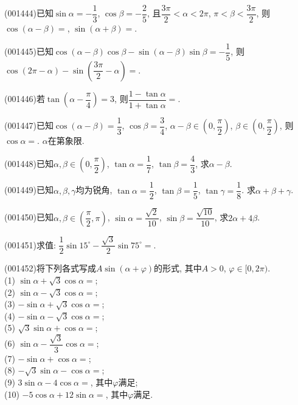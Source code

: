 \item (001444)已知$\sin\alpha=-\dfrac{1}{3}$, $\cos\beta=-\dfrac{2}{5}$, 且$\dfrac{3\pi}{2}<\alpha<2\pi$, $\pi<\beta<\dfrac{3\pi}{2}$, 则$\cos(\alpha-\beta)=$, $\sin(\alpha+\beta)=$.
\item (001445)已知$\cos(\alpha-\beta)\cos\beta-\sin(\alpha-\beta)\sin\beta=-\dfrac{1}{5}$, 则$\cos(2\pi-\alpha)-\sin\left(\dfrac{3\pi}{2}-\alpha\right)=$.
\item (001446)若$\tan\left(\alpha-\dfrac{\pi}4\right)=3$, 则$\dfrac{1-\tan\alpha}{1+\tan\alpha}=$.
\item (001447)已知$\cos(\alpha-\beta)=\dfrac 13$, $\cos \beta=\dfrac 34$, $\alpha-\beta \in \left(0,\dfrac{\pi}{2}\right)$, $\beta\in \left(0,\dfrac{\pi}{2}\right)$, 则$\cos\alpha=$. $\alpha$在第象限.
\item (001448)已知$\alpha,\beta\in \left(0,\dfrac{\pi}{2}\right)$, $\tan\alpha=\dfrac{1}{7}$, $\tan\beta=\dfrac{4}{3}$, 求$\alpha-\beta$.
\item (001449)已知$\alpha,\beta,\gamma$均为锐角, $\tan\alpha=\dfrac{1}{2}$, $\tan\beta=\dfrac{1}{5}$, $\tan\gamma=\dfrac{1}{8}$. 求$\alpha+\beta+\gamma$.
\item (001450)已知$\alpha,\beta\in \left(\dfrac{\pi}{2},\pi\right)$, $\sin\alpha=\dfrac{\sqrt{2}}{10}$, $\sin\beta=\dfrac{\sqrt{10}}{10}$, 求$2\alpha+4\beta$.
\item (001451)求值: $\dfrac 1 2\sin 15^\circ-\dfrac{\sqrt{3}}{2}\sin 75^\circ=$.
\item (001452)将下列各式写成$A\sin(\alpha+\varphi)$的形式, 其中$A>0$, $\varphi\in [0,2\pi)$.\\ 
(1) $\sin\alpha+\sqrt{3}\cos\alpha=$;\\ 
(2) $\sin\alpha-\sqrt{3}\cos\alpha=$;\\ 
(3) $-\sin\alpha+\sqrt{3}\cos\alpha=$;\\ 
(4) $-\sin\alpha-\sqrt{3}\cos\alpha=$;\\ 
(5) $\sqrt{3}\sin\alpha+\cos\alpha=$;\\ 
(6) $\sin\alpha-\dfrac{\sqrt{3}}{3}\cos\alpha=$;\\ 
(7) $-\sin\alpha+\cos\alpha=$;\\ 
(8) $-\sqrt{3}\sin\alpha-\cos\alpha=$;\\ 
(9) $3\sin\alpha-4\cos\alpha=$, 其中$\varphi$满足;\\ 
(10) $-5\cos\alpha+12\sin\alpha=$, 其中$\varphi$满足.
